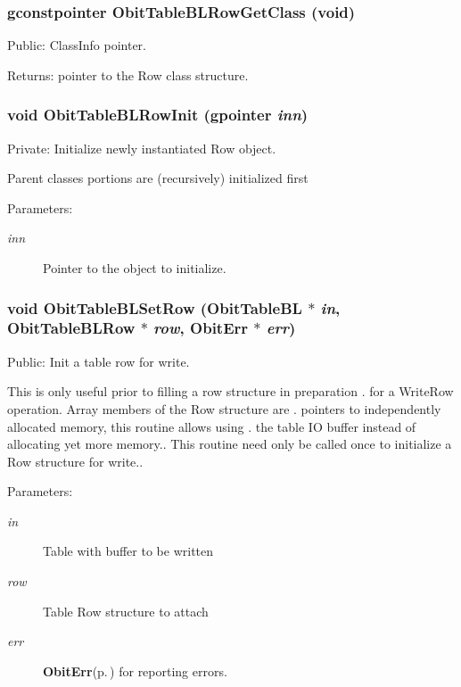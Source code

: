 \subsubsection{\setlength{\rightskip}{0pt plus 5cm}gconstpointer Obit\-Table\-BLRow\-Get\-Class (void)}\label{ObitTableBL_8c_a15}


Public: Class\-Info pointer. 

\begin{Desc}
\item[Returns:]pointer to the Row class structure. \end{Desc}
\subsubsection{\setlength{\rightskip}{0pt plus 5cm}void Obit\-Table\-BLRow\-Init (gpointer {\em inn})}\label{ObitTableBL_8c_a6}


Private: Initialize newly instantiated Row object. 

Parent classes portions are (recursively) initialized first \begin{Desc}
\item[Parameters:]
\begin{description}
\item[{\em inn}]Pointer to the object to initialize. \end{description}
\end{Desc}
\subsubsection{\setlength{\rightskip}{0pt plus 5cm}void Obit\-Table\-BLSet\-Row ({\bf Obit\-Table\-BL} $\ast$ {\em in}, {\bf Obit\-Table\-BLRow} $\ast$ {\em row}, {\bf Obit\-Err} $\ast$ {\em err})}\label{ObitTableBL_8c_a23}


Public: Init a table row for write. 

This is only useful prior to filling a row structure in preparation . for a Write\-Row operation. Array members of the Row structure are . pointers to independently allocated memory, this routine allows using . the table IO buffer instead of allocating yet more memory.. This routine need only be called once to initialize a Row structure for write.. \begin{Desc}
\item[Parameters:]
\begin{description}
\item[{\em in}]Table with buffer to be written \item[{\em row}]Table Row structure to attach \item[{\em err}]{\bf Obit\-Err}{\rm (p.\,\pageref{structObitErr})} for reporting errors. \end{description}
\end{Desc}
